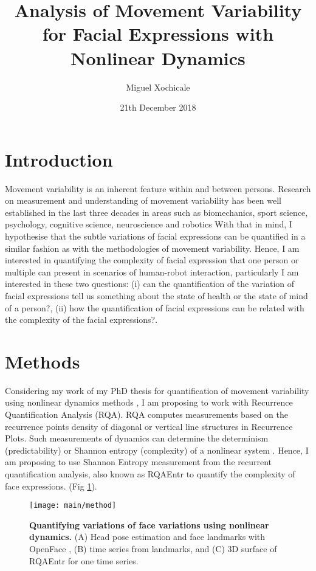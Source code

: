 \documentclass[12pt]{article}
\title{
Analysis of Movement Variability for Facial Expressions 
with Nonlinear Dynamics
}
\author{Miguel Xochicale\\ 
}
\date{21th December 2018}
\begin{document}
\maketitle


%


\section{Introduction}
Movement variability is an inherent feature within and between persons. 
Research on measurement and understanding of movement variability has been 
well established in the last three decades in areas such as biomechanics, 
sport science, psychology, cognitive science, neuroscience and robotics 
\cite{XochicalePhDThesis2018}
With that in mind, I hypothesise that the subtle variations of facial 
expressions can be quantified in a similar fashion as with the methodologies 
of movement variability. Hence, I am interested in quantifying the complexity 
of facial expression that one person or multiple can present in scenarios 
of human-robot interaction, particularly I am interested in these two questions: 
(i) can the quantification of the variation of facial expressions tell us 
something about the state of health or the state of mind of a person?, 
(ii) how the quantification of facial expressions can be related with 
the complexity of the facial expressions?.


\section{Methods}
Considering my work of my PhD thesis for quantification of movement variability 
using nonlinear dynamics methods \cite{2018arXiv181009249X},
I am proposing to work with Recurrence Quantification Analysis (RQA). 
RQA computes measurements based on the recurrence points density of diagonal 
or vertical line structures in Recurrence Plots. 
Such measurements of dynamics can determine the determinism (predictability) 
or Shannon entropy (complexity) of a nonlinear system \cite{marwan2007}. 
Hence, I am proposing to use Shannon Entropy measurement 
from the recurrent quantification analysis, also known as RQAEntr 
to quantify the complexity of face expressions. 
(Fig \ref{fig:method}).


\begin{figure}
\centering
\texttt{[image: main/method]}
    \caption{
	{\bf Quantifying variations of face variations using nonlinear dynamics.}
	(A) Head pose estimation and face landmarks with OpenFace \cite{baltrusaitis2018},
	(B) time series from landmarks, and
	(C) 3D surface of RQAEntr for one time series.
        }
\label{fig:method}
\end{figure}








\end{document}
